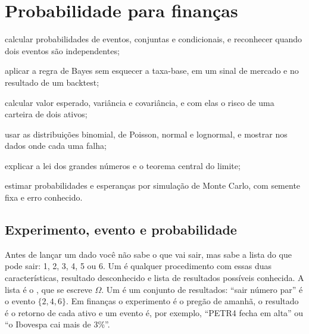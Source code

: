 \chapter{Probabilidade para finanças}
\label{cap:probabilidade}


\begin{objetivos}
  \item calcular probabilidades de eventos, conjuntas e condicionais, e reconhecer quando dois eventos são independentes;
  \item aplicar a regra de Bayes sem esquecer a taxa-base, em um sinal de mercado e no resultado de um backtest;
  \item calcular valor esperado, variância e covariância, e com elas o risco de uma carteira de dois ativos;
  \item usar as distribuições binomial, de Poisson, normal e lognormal, e mostrar nos dados onde cada uma falha;
  \item explicar a lei dos grandes números e o teorema central do limite;
  \item estimar probabilidades e esperanças por simulação de Monte Carlo, com semente fixa e erro conhecido.
\end{objetivos}

\section{Experimento, evento e probabilidade}
\label{sec:c03-eventos}

Antes de lançar um dado você não sabe o que vai sair, mas sabe a lista do que pode sair: 1, 2, 3, 4, 5 ou 6. Um  é qualquer procedimento com essas duas características, resultado desconhecido e lista de resultados possíveis conhecida. A lista é o , que se escreve $\Omega$. Um  é um conjunto de resultados: ``sair número par'' é o evento $\{2, 4, 6\}$. Em finanças o experimento é o pregão de amanhã, o resultado é o retorno de cada ativo e um evento é, por exemplo, ``PETR4 fecha em alta'' ou ``o Ibovespa cai mais de 3\%''.

